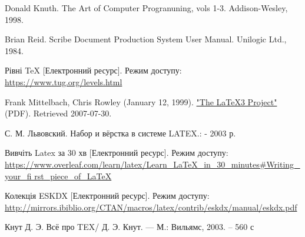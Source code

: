     \newpage
	\renewcommand\refname{\uppercase{Список використаних джерел}}

	\begin{thebibliography}{6}
		
		Donald Knuth. The Art of Computer Progranuning, vols 1-3.
		Addison-Wesley, 1998. 
		 
		Brian Reid. Scribe Document Production System User
		Manual. Unilogic Ltd., 1984.
		
		Рівні TeX [Електронний ресурс]. Режим доступу: \href{https://www.tug.org/levels.html}{https://www.tug.org/levels.html}
		
		Frank Mittelbach, Chris Rowley (January 12, 1999). \href{https://www.latex-project.org/help/documentation/ltx3info.pdf}{"The LaTeX3 Project"} (PDF). Retrieved 2007-07-30.
		
		С. М. Львовский. Набор и вёрстка в системе LATEX.: - 2003 р.
		
		Вивчіть Latex за 30 хв [Електронний ресурс]. Режим доступу:
		\href{https://www.overleaf.com/learn/latex/Learn_LaTeX_in_30_minutes#Writing_your_first_piece_of_LaTeX}{https://www.overleaf.com/learn/latex/Learn\_LaTeX\_in\_30\_minutes\#Writing\_your\_fi
		rst\_piece\_of\_LaTeX}
	
		Колекція ESKDX [Електронний ресурс]. Режим доступу: \href{http://mirrors.ibiblio.org/CTAN/macros/latex/contrib/eskdx/manual/eskdx.pdf}{http://mirrors.ibiblio.org/CTAN/macros/latex/contrib/eskdx/manual/eskdx.pdf}
		
		Кнут Д. Э. Всё про TEX/ Д. Э. Кнут. — М.: Вильямс, 2003. – 560 с
	\end{thebibliography}
